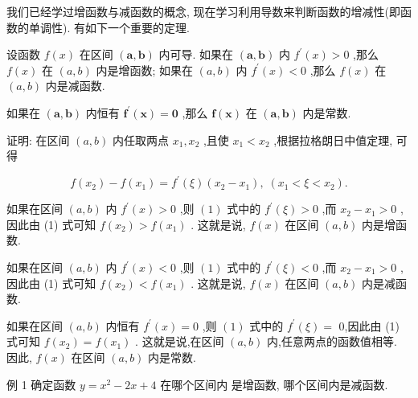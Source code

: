 \documentclass[lang=cn,newtx,12pt,scheme=chinese]{elegantbook}
\begin{document}
我们已经学过增函数与减函数的概念, 现在学习利用导数来判断函数的增减性(即函数的单调性). 有如下一个重要的定理.

\begin{theorem}[定理]

设函数 \(f\left( x\right)\) 在区间 \(\left( {\mathbf{a},\mathbf{b}}\right)\) 内可导. 如果在 \(\left( {\mathbf{a},\mathbf{b}}\right)\) 内 \({f}^{\prime }\left( x\right) > 0\) ,那么 \(f\left( x\right)\) 在 \(\left( {a,b}\right)\) 内是增函数; 如果在 \(\left( {a,b}\right)\) 内 \({f}^{\prime }\left( x\right) < 0\) ,那么 \(f\left( x\right)\) 在 \(\left( {a,b}\right)\) 内是减函数.

如果在 \(\left( {\mathbf{a},\mathbf{b}}\right)\) 内恒有 \({\mathbf{f}}^{\prime }\left( \mathbf{x}\right) = \mathbf{0}\) ,那么 \(\mathbf{f}\left( \mathbf{x}\right)\) 在 \(\left( {\mathbf{a},\mathbf{b}}\right)\) 内是常数.

\end{theorem}

证明: 在区间 \(\left( {a,b}\right)\) 内任取两点 \({x}_{1},{x}_{2}\) ,且使 \({x}_{1} < {x}_{2}\) ,根据拉格朗日中值定理, 可得

\[
f\left( {x}_{2}\right) - f\left( {x}_{1}\right) = {f}^{\prime }\left( \xi \right) \left( {{x}_{2} - {x}_{1}}\right) ,\;\left( {{x}_{1} < \xi < {x}_{2}}\right) . \tag{1}
\]

如果在区间 \(\left( {a,b}\right)\) 内 \({f}^{\prime }\left( x\right) > 0\) ,则 \(\left( 1\right)\) 式中的 \({f}^{\prime }\left( \xi \right) > 0\) ,而 \({x}_{2} - {x}_{1} > 0\) ,因此由 (1) 式可知 \(f\left( {x}_{2}\right) > f\left( {x}_{1}\right)\) . 这就是说, \(f\left( x\right)\) 在区间 \(\left( {a,b}\right)\) 内是增函数.

如果在区间 \(\left( {a,b}\right)\) 内 \({f}^{\prime }\left( x\right) < 0\) ,则 \(\left( 1\right)\) 式中的 \({f}^{\prime }\left( \xi \right) < 0\) ,而 \({x}_{2} - {x}_{1} > 0\) ,因此由 (1) 式可知 \(f\left( {x}_{2}\right) < f\left( {x}_{1}\right)\) . 这就是说, \(f\left( x\right)\) 在区间 \(\left( {a,b}\right)\) 内是减函数.

如果在区间 \(\left( {a,b}\right)\) 内恒有 \({f}^{\prime }\left( x\right) = 0\) ,则 \(\left( 1\right)\) 式中的 \({f}^{\prime }\left( \xi \right) =\) 0,因此由 (1) 式可知 \(f\left( {x}_{2}\right) = f\left( {x}_{1}\right)\) . 这就是说,在区间 \(\left( {a,b}\right)\) 内,任意两点的函数值相等. 因此, \(f\left( x\right)\) 在区间 \(\left( {a,b}\right)\) 内是常数.

例 1 确定函数 \(y = {x}^{2} - {2x} + 4\) 在哪个区间内 是增函数, 哪个区间内是减函数.
\end{document}
